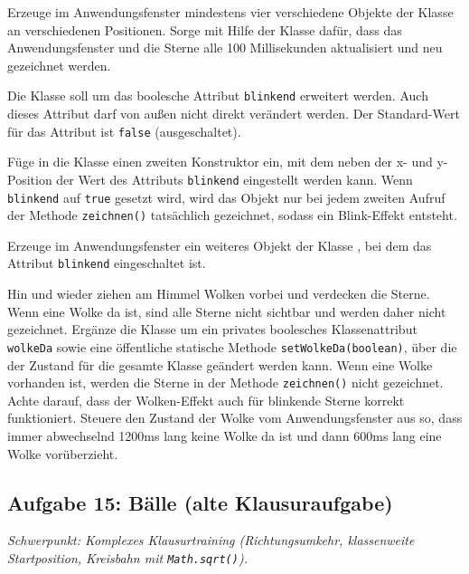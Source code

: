 \begin{compactenum}[a)]
\vspace{1mm}

\item Erzeuge im Anwendungsfenster mindestens vier verschiedene Objekte der
Klasse  an verschiedenen Positionen. Sorge mit Hilfe der Klasse
 dafür, dass das Anwendungsfenster und die Sterne alle 100
Millisekunden aktualisiert und neu gezeichnet werden.

\item Die Klasse  soll um das boolesche Attribut
\lstinline|blinkend| erweitert werden. Auch dieses Attribut darf von außen nicht
direkt verändert werden. Der Standard-Wert für das Attribut ist \lstinline|false|
(ausgeschaltet).

Füge in die Klasse einen zweiten Konstruktor ein, mit dem neben der x- und
y-Position der Wert des Attributs \lstinline|blinkend| eingestellt werden kann.
Wenn \lstinline|blinkend| auf \lstinline|true| gesetzt wird, wird das Objekt nur
bei jedem zweiten Aufruf der Methode \lstinline|zeichnen()| tatsächlich
gezeichnet, sodass ein Blink-Effekt entsteht.

Erzeuge im Anwendungsfenster ein weiteres Objekt der Klasse , bei
dem das Attribut \lstinline|blinkend| eingeschaltet ist.

\item Hin und wieder ziehen am Himmel Wolken vorbei und verdecken die Sterne.
Wenn eine Wolke da ist, sind alle Sterne nicht sichtbar und werden daher nicht
gezeichnet. Ergänze die Klasse  um ein privates boolesches
Klassenattribut \lstinline|wolkeDa| sowie eine öffentliche statische Methode 
\lstinline|setWolkeDa(boolean)|, über die der Zustand für die gesamte Klasse 
geändert werden kann. Wenn eine Wolke vorhanden ist, werden die Sterne in der 
Methode \lstinline|zeichnen()| nicht gezeichnet. Achte darauf, dass der 
Wolken-Effekt auch für blinkende Sterne korrekt funktioniert.
Steuere den Zustand der Wolke vom Anwendungsfenster aus so,
dass immer abwechselnd 1200ms lang keine Wolke da ist und dann 600ms
lang eine Wolke vorüberzieht.
\end{compactenum}

\subsection{Aufgabe 15: Bälle (alte Klausuraufgabe) \tagLK}
\noindent \emph{Schwerpunkt: Komplexes Klausurtraining (Richtungsumkehr, klassenweite Startposition, Kreisbahn mit \texttt{Math.sqrt()}).}

